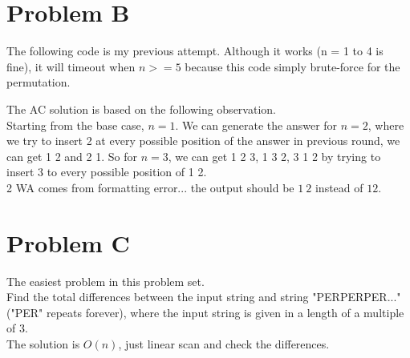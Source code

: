 \documentclass[10pt]{article}
\begin{document}


\newpage



\section*{Problem B}

The following code is my previous attempt. Although it works (n = 1 to 4 is fine), it will timeout when $n >=5$ because this code simply brute-force for the permutation. \\

 

\newpage

The AC solution is based on the following observation.\\

Starting from the base case, $n = 1$. We can generate the answer for $n = 2$, where we try to insert 2 at every possible position of the answer in previous round, we can get 1 2 and 2 1. So for $n = 3$, we can get 1 2 3, 1 3 2, 3 1 2 by trying to insert 3 to every possible position of 1 2.\\

2 WA comes from formatting error... the output should be $1\ 2$ instead of $12$.\\

 

\newpage



\section*{Problem C}

The easiest problem in this problem set.\\

Find the total differences between the input string and string "PERPERPER..." ("PER" repeats forever), where the input string is given in a length of a multiple of 3.\\

The solution is $O(n)$, just linear scan and check the differences.\\



\newpage
\end{document}
